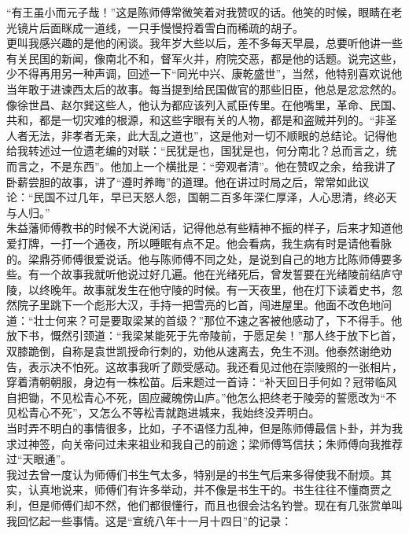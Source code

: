 “有王虽小而元子哉！”这是陈师傅常微笑着对我赞叹的话。他笑的时候，眼睛在老光镜片后面眯成一道线，一只手慢慢捋着雪白而稀疏的胡子。\\

更叫我感兴趣的是他的闲谈。我年岁大些以后，差不多每天早晨，总要听他讲一些有关民国的新闻，像南北不和，督军火并，府院交恶，都是他的话题。说完这些，少不得再用另一种声调，回述一下“同光中兴、康乾盛世”，当然，他特别喜欢说他当年敢于进谏西太后的故事。每当提到给民国做官的那些旧臣，他总是忿忿然的。像徐世昌、赵尔巽这些人，他认为都应该列入贰臣传里。在他嘴里，革命、民国、共和，都是一切灾难的根源，和这些字眼有关的人物，都是和盗贼并列的。“非圣人者无法，非孝者无亲，此大乱之道也”，这是他对一切不顺眼的总结论。记得他给我转述过一位遗老编的对联：“民犹是也，国犹是也，何分南北？总而言之，统而言之，不是东西”。他加上一个横批是：“旁观者清”。他在赞叹之余，给我讲了卧薪尝胆的故事，讲了“遵时养晦”的道理。他在讲过时局之后，常常如此议论：“民国不过几年，早已天怒人怨，国朝二百多年深仁厚泽，人心思清，终必天与人归。”\\

朱益藩师傅教书的时候不大说闲话，记得他总有些精神不振的样子，后来才知道他爱打牌，一打一个通夜，所以睡眠有点不足。他会看病，我生病有时是请他看脉的。梁鼎芬师傅很爱说话。他与陈师傅不同之处，是说到自己的地方比陈师傅要多些。有一个故事我就听他说过好几遍。他在光绪死后，曾发誓要在光绪陵前结庐守陵，以终晚年。故事就发生在他守陵的时候。有一天夜里，他在灯下读着史书，忽然院子里跳下一个彪形大汉，手持一把雪亮的匕首，闯进屋里。他面不改色地问道：“壮士何来？可是要取梁某的首级？”那位不速之客被他感动了，下不得手。他放下书，慨然引颈道：“我梁某能死于先帝陵前，于愿足矣！”那人终于放下匕首，双膝跪倒，自称是袁世凯授命行刺的，劝他从速离去，免生不测。他泰然谢绝劝告，表示决不怕死。这故事我听了颇受感动。我还看见过他在崇陵照的一张相片，穿着清朝朝服，身边有一株松苗。后来题过一首诗：“补天回日手何如？冠带临风自把锄，不见松青心不死，固应藏魄傍山庐。”他怎么把终老于陵旁的誓愿改为“不见松青心不死”，又怎么不等松青就跑进城来，我始终没弄明白。\\

当时弄不明白的事情很多，比如，子不语怪力乱神，但是陈师傅最信卜卦，并为我求过神签，向关帝问过未来祖业和我自己的前途；梁师傅笃信扶；朱师傅向我推荐过“天眼通”。\\

我过去曾一度认为师傅们书生气太多，特别是的书生气后来多得使我不耐烦。其实，认真地说来，师傅们有许多举动，并不像是书生干的。书生往往不懂商贾之利，但是师傅们却不然，他们都很懂行，而且也很会沽名钓誉。现在有几张赏单叫我回忆起一些事情。这是“宣统八年十一月十四日”的记录：\\

